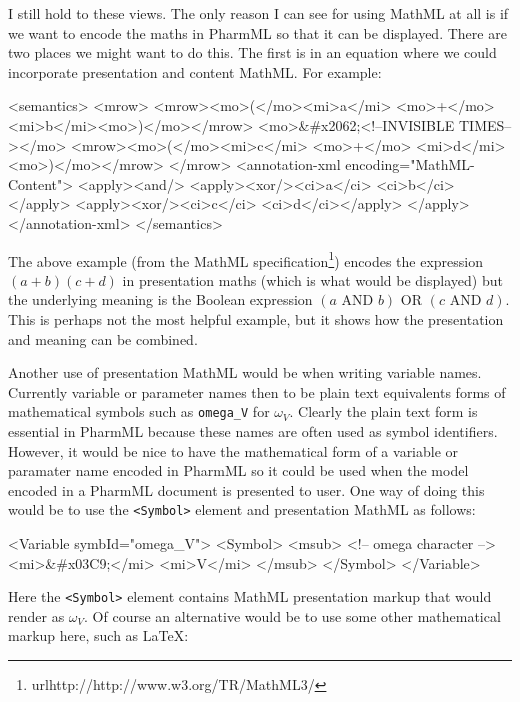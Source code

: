 \documentclass[a4paper,11pt]{article}
\newcommand{\mathml}{MathML\xspace}
\newcommand{\pharmml}{PharmML\xspace}
\newcommand{\xelem}[1]{\texttt{<#1>}\index{XML Element!\texttt{<#1>}}}
\begin{document}
I still hold to these views. The only reason I can see for using
\mathml at all is if we want to encode the maths in \pharmml so that
it can be displayed. There are two places we might want to do
this. The first is in an equation where we could incorporate
presentation and content \mathml. For example:

\begin{xmlcode}
<semantics>
  <mrow>
    <mrow><mo>(</mo><mi>a</mi> <mo>+</mo> <mi>b</mi><mo>)</mo></mrow>
    <mo>&#x2062;<!--INVISIBLE TIMES--></mo>
    <mrow><mo>(</mo><mi>c</mi> <mo>+</mo> <mi>d</mi><mo>)</mo></mrow>
  </mrow>
  <annotation-xml encoding="MathML-Content">
    <apply><and/>
      <apply><xor/><ci>a</ci> <ci>b</ci></apply>
      <apply><xor/><ci>c</ci> <ci>d</ci></apply>
    </apply>
  </annotation-xml>
</semantics>
\end{xmlcode}

The above example (from the \mathml
specification\footnote{url{http://http://www.w3.org/TR/MathML3/}})
encodes the expression $(a+b)(c+d)$ in presentation maths (which is
what would be displayed) but the underlying meaning is the Boolean
expression $(a \text{ AND } b) \text{ OR } (c \text{ AND } d)$. This
is perhaps not the most helpful example, but it shows how the
presentation and meaning can be combined.

Another use of presentation \mathml would be when writing variable
names. Currently variable or parameter names then to be plain text
equivalents forms of mathematical symbols such as \texttt{omega\_V}
for $\omega_V$. Clearly the plain text form is essential in \pharmml
because these names are often used as symbol identifiers. However, it
would be nice to have the mathematical form of a variable or paramater
name encoded in \pharmml so it could be used when the model encoded in
a \pharmml document is presented to user. One way of doing this would
be to use the \xelem{Symbol} element and presentation \mathml as
follows:

\begin{xmlcode}
<Variable symbId="omega_V">
    <Symbol>
        <msub>
            <!-- omega character -->
            <mi>&#x03C9;</mi>
            <mi>V</mi>
        </msub>
    </Symbol>
</Variable>
\end{xmlcode}

Here the \xelem{Symbol} element contains \mathml presentation markup
that would render as $\omega_V$. Of course an alternative would be to
use some other mathematical markup here, such as \LaTeX:
\end{document}
